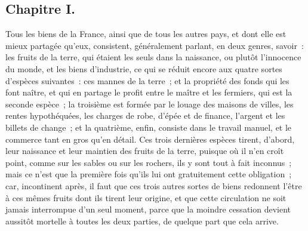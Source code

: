 \documentclass[french,twoside]{book} %
\begin{document}
\subsection[{Chapitre I.}]{Chapitre I.}
\noindent Tous les biens de la France, ainsi que de tous les autres pays, et dont elle est mieux partagée qu’eux, consistent, généralement parlant, en deux genres, savoir : les fruits de la terre, qui étaient les seuls dans la naissance, ou plutôt l’innocence du monde, et les biens d’industrie, ce qui se réduit encore aux quatre sortes d’espèces suivantes : ces mannes de la terre ; et la propriété des fonds qui les font naître, et qui en partage le profit entre le maître et les fermiers, qui est la seconde espèce ; la troisième est formée par le louage des maisons de villes, les rentes hypothéquées, les charges de robe, d’épée et de finance, l’argent et les billets de change ; et la quatrième, enfin, consiste dans le travail manuel, et le commerce tant en gros qu’en détail. Ces trois dernières espèces tirent, d’abord, leur naissance et leur maintien des fruits de la terre, puisque où il n’en croît point, comme sur les sables ou sur les rochers, ils y sont tout à fait inconnus ; mais ce n’est que la première fois qu’ils lui ont gratuitement cette obligation ; car, incontinent après, il faut que ces trois autres sortes de biens redonnent l’être à ces mêmes fruits dont ils tirent leur origine, et que cette circulation ne soit jamais interrompue d’un seul moment, parce que la moindre cessation devient aussitôt mortelle à toutes les deux parties, de quelque part que cela arrive.\par
\end{document}
